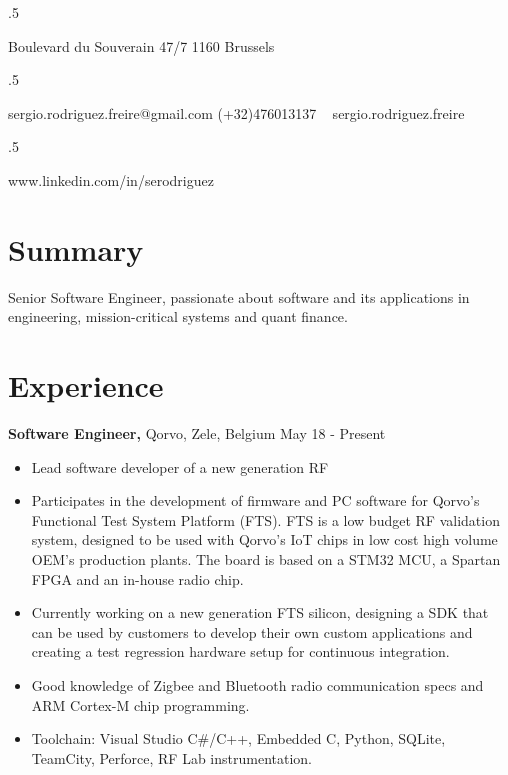 \documentclass[margin]{res}
\begin{document}
 
 

\begin{resume} 

\moveleft.5\hoffset\centerline{Boulevard du Souverain 47/7 1160 Brussels}
\moveleft.5\hoffset\centerline{sergio.rodriguez.freire@gmail.com \hspace{2 mm} \Mobilefone \hspace{1 mm} (+32)476013137 \hspace{2 mm} \faSkype\ \hspace{1 mm} sergio.rodriguez.freire}
\moveleft.5\hoffset\centerline{\faLinkedin \hspace{1 mm} www.linkedin.com/in/serodriguez}


\section{Summary}
Senior Software Engineer, passionate about software and its applications in engineering, mission-critical systems and quant finance.

\section{Experience}

 {\bf Software Engineer,} Qorvo, Zele, Belgium \hfill May 18 - Present
 \begin{itemize} \itemsep -2pt
 \item Lead software developer of a new generation RF 
 \item Participates in the development of firmware and PC software for Qorvo's Functional Test System Platform (FTS). FTS is a low budget RF validation system, designed to be used with Qorvo's IoT chips in low cost high volume OEM's production plants. The board is based on a STM32 MCU, a Spartan FPGA and an in-house radio chip.
 \item Currently working on a new generation FTS silicon, designing a SDK that can be used by customers to develop their own custom applications and creating a test regression hardware setup for continuous integration.
 \item Good knowledge of Zigbee and Bluetooth radio communication specs and ARM Cortex-M chip programming.
 \item Toolchain: Visual Studio C\#/C++, Embedded C, Python, SQLite, TeamCity, Perforce, RF Lab instrumentation.
\end{itemize}


\end{resume}
\end{document}
